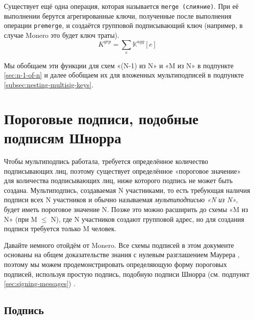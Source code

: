 Существует ещё одна операция, которая называется {\tt merge (слияние)}. При её выполнении берутся агрегированные ключи, полученные после выполнения операции {\tt premerge}, и создаёт\-ся групповой подписывающий ключ (например, в случае Monero это будет ключ траты).\vspace{.175cm}
\[K^{grp} = \sum_e \mathbb{K}^{agg}[e]\]

Мы обобщаем эти функции для схем «(N-1) из N» и «M из N» в подпункте \ref{sec:n-1-of-n} и далее обобщаем их для вложенных мультиподписей в подпункте \ref{subsec:nesting-multisig-keys}.



\section{Пороговые подписи, подобные подписям Шнорра}
\label{sec:threshold-schnorr}

Чтобы мультиподпись работала, требуется определённое количество подписывающих лиц, поэтому существует определённое «пороговое значение» для количества подписывающих лиц, ниже которого подпись не может быть создана. Мультиподпись, создаваемая N участниками, то есть требующая наличия подписи всех N участников и обычно называемая {\em мультипод\-писью «N из N»}, будет иметь пороговое значение N. Позже это можно расширить до схемы «M из N» (при M $\leq$ N), где N участников создают групповой адрес, но для создания подписи требуется только M человек.

Давайте немного отойдём от Monero. Все схемы подписей в этом документе основаны на общем доказательстве знания с нулевым разглашением Маурера \cite{simple-zk-proof-maurer}, поэтому мы можем продемонстрировать определяющую форму пороговых подписей, используя простую подпись, подобную подписи Шнорра (см. подпункт \ref{sec:signing-messages}) \cite{old-multisig-mrl-note}.


\subsection*{Подпись}


